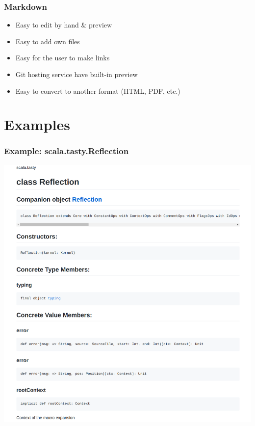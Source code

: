 \documentclass{beamer}
\begin{document}
\begin{frame}
  \frametitle{Markdown}
  \begin{itemize}
    \item Easy to edit by hand \& preview \pause
    \item Easy to add own files \pause
    \item Easy for the user to make links \pause
    \item Git hosting service have built-in preview \pause
    \item Easy to convert to another format (HTML, PDF, etc.)
  \end{itemize}
\end{frame}

\section{Examples}

\begin{frame}
  \frametitle{Example: scala.tasty.Reflection}
  \begin{center}
    \includegraphics[width=\textwidth,height=0.9\textheight,keepaspectratio]{images/reflection.png}
  \end{center}
\end{frame}
\end{document}
